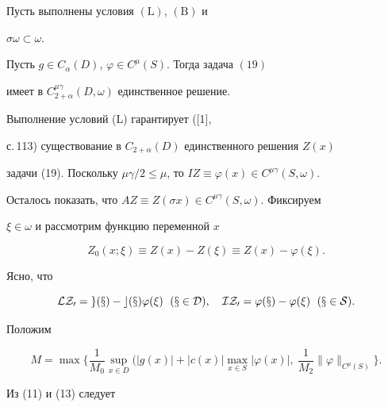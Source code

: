  


\begin{prop} 


Пусть выполнены условия $(\mathrm L)$, $(\mathrm B)$ и 


$\sigma\omega\subset\omega$. 


Пусть $g\in C_\alpha(D)$, $\varphi\in C^\mu(S)$. Тогда задача $(19)$ 


имеет в $C^{\mu\gamma}_{2+\alpha}(D,\omega)$ единственное решение.


\end{prop} 


 


\begin{pf} 


Выполнение условий (L) гарантирует ([1], 


с.\,113) существование в $C_{2+\alpha}(D)$ единственного решения $Z(x)$ 


задачи (19). Поскольку $\mu\gamma/2\le\mu$, то $IZ\equiv\varphi(x)\in 


C^{\mu\gamma}(S,\omega)$. 


Осталось показать, что $AZ\equiv Z(\sigma x)\in 


C^{\mu\gamma}(S,\omega)$. Фиксируем 


$\xi\in\omega$ и рассмотрим функцию переменной $x$ 


\begin{equation} 


Z_0(x;\xi)\equiv Z(x)-Z(\xi)\equiv Z(x)-\varphi(\xi). 


\end{equation} 


Ясно, что 


\begin{equation} 


\cal L Z_0=g(x)-c(x)\varphi(\xi)\ \; (x\in D),\quad 


IZ_0=\varphi(x)-\varphi(\xi)\ \; (x\in S). 


\end{equation} 


Положим 


$$ 


M=\max\bigg\{\frac{1}{M_0}\sup_{x\in D}\bigg( 


|g(x)|+|c(x)|\max_{x\in S}|\varphi(x)|,\ \frac{1}{M_2} 


\|\varphi\|_{C^\mu(S)}\bigg\}. 


$$ 


Из (11) и (13) следует 



\end{pf}
